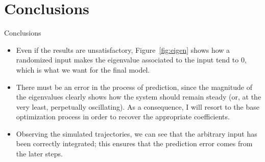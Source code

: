 \documentclass{beamer}
\begin{document}
\section{Conclusions}

\begin{frame}{Conclusions}
    \begin{itemize}
        \item Even if the results are unsatisfactory, Figure~\ref{fig:eigen} shows how a randomized input makes the eigenvalue associated to the input tend to 0, which is what we want for the final model.
        \item There must be an error in the process of prediction, since the magnitude of the eigenvalues clearly shows how the system should remain steady (or, at the very least, perpetually oscillating). As a consequence, I will resort to the base optimization process in order to recover the appropriate coefficients.
        \item Observing the simulated trajectories, we can see that the arbitrary input has been correctly integrated; this ensures that the prediction error comes from the later steps.
    \end{itemize}
\end{frame}
\end{document}
